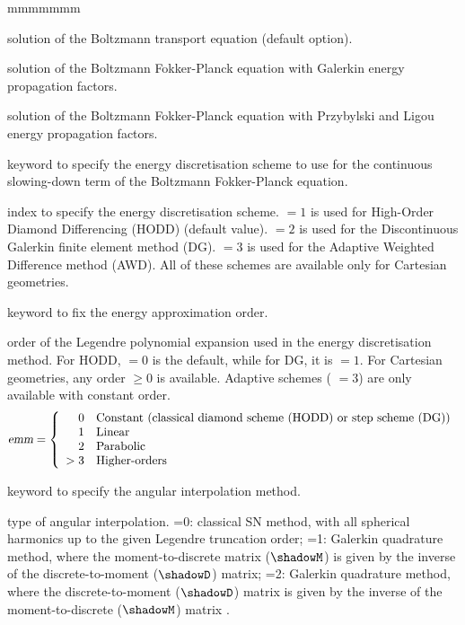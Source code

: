 \begin{ListeDeDescription}{mmmmmmm}
\item[\moc{BTE}] solution of the Boltzmann transport equation (default option).

\item[\moc{BFPG}] solution of the Boltzmann Fokker-Planck equation with Galerkin energy propagation factors.

\item[\moc{BFPL}] solution of the Boltzmann Fokker-Planck equation with Przybylski and Ligou energy propagation factors.\cite{ligou}

\item[\moc{ESCHM}] keyword to specify the energy discretisation scheme to use for the continuous slowing-down term of the Boltzmann Fokker-Planck equation. 

\item[\dusa{eschm}] index to specify the energy discretisation scheme.  $=1$ is used for High-Order Diamond Differencing (HODD) (default value).  $=2$ is
used for the Discontinuous Galerkin finite element method (DG).  $=3$ is used for the Adaptive Weighted Difference method (AWD). All of these schemes are available
only for Cartesian geometries.

\item[\moc{EDIAM}] keyword to fix the energy approximation order.

\item[\dusa{emm}] order of the Legendre polynomial expansion used in the energy discretisation method. For HODD,  $=0$ is the default, while for DG,
it is  $=1$. For Cartesian geometries, any order  $\geq0$ is available. Adaptive schemes ( $=3$) are only available with
constant order.
\begin{displaymath}
\dusa{emm} = \left\{
\begin{array}{rl}
 0 & \textrm{Constant (classical diamond scheme (HODD) or step scheme (DG))} \\
 1 & \textrm{Linear} \\
 2 & \textrm{Parabolic} \\
 >3  & \textrm{Higher-orders}
\end{array} \right.
\end{displaymath}

\item[\moc{GQ}] keyword to specify the angular interpolation method.

\item[\dusa{igq}] type of angular interpolation. =0: classical SN method, with all spherical harmonics up to the given Legendre truncation order; =1: Galerkin
quadrature method, where the moment-to-discrete matrix ($\shadowM$) is given by the inverse of the discrete-to-moment ($\shadowD$) matrix; =2: Galerkin quadrature
method, where the discrete-to-moment ($\shadowD$) matrix is given by the inverse of the moment-to-discrete ($\shadowM$) matrix \cite{morel1989,shands2024}.


\end{ListeDeDescription}
